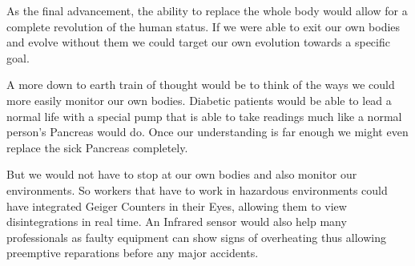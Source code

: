 \documentclass[
			12pt,
			a4paper,
			cleardoublepage=empty,
			final,
			twoside
				]{scrbook}
\begin{document}
      \begin{par}
        As the final advancement, the ability to replace the whole body would allow for a complete revolution of the human status. 
        If we were able to exit our own bodies and evolve without them we could target our own evolution towards a specific goal.\cite{NBICReport} 
      \end{par}
      \begin{par}
        A more down to earth train of thought would be to think of the ways we could more easily monitor our own bodies. 
        Diabetic patients would be able to lead a normal life with a special pump that is able to take readings much like a normal person's Pancreas would do. 
        Once our understanding is far enough we might even replace the sick Pancreas completely.
      \end{par}
      \begin{par}
        But we would not have to stop at our own bodies and also monitor our environments. 
        So workers that have to work in hazardous environments could have integrated Geiger Counters in their Eyes, allowing them to view disintegrations in real time. 
        An Infrared sensor would also help many professionals as faulty equipment can show signs of overheating thus allowing preemptive reparations before any major accidents.
      \end{par}
\end{document}
